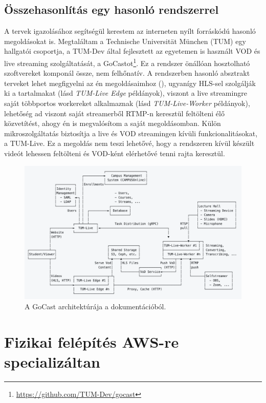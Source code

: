 \subsection{Összehasonlítás egy hasonló rendszerrel}

A tervek igazolásához segítségül kerestem az interneten nyílt forráskódú hasonló megoldásokat is. Megtaláltam a Technische Universität München (TUM) egy hallgatói csoportja, a TUM-Dev által fejlesztett az egyetemen is használt VOD és live streaming szolgáltatását, a GoCastot\footnote{\url{https://github.com/TUM-Dev/gocast}}. Ez a rendszer önállóan hosztolható szoftvereket komponál össze, nem felhőnatív. A rendszerben hasonló absztrakt terveket lehet megfigyelni az én megoldásaimhoz (), ugyanígy HLS-sel szolgálják ki a tartalmakat (lásd \emph{TUM-Live Edge} példányok), viszont a live streamingre saját többportos workereket alkalmaznak (lásd \emph{TUM-Live-Worker} példányok), lehetőség ad viszont saját streamerből RTMP-n keresztül feltölteni élő közvetítést, ahogy én is megvalósítom a saját megoldásomban. Külön mikroszolgáltatás biztosítja a live és VOD streamingen kívüli funkcionalitásokat, a TUM-Live. Ez a megoldás nem teszi lehetővé, hogy a rendszeren kívül készült videót lehessen feltölteni és VOD-ként elérhetővé tenni rajta keresztül.

\begin{figure}[]
	\centering
	\includegraphics[width=140mm, keepaspectratio]{figures/gocast.png}
	\caption{A GoCast architektúrája a dokumentációból.}
	\label{fig:gocast}
\end{figure}

\section{Fizikai felépítés AWS-re specializáltan}

